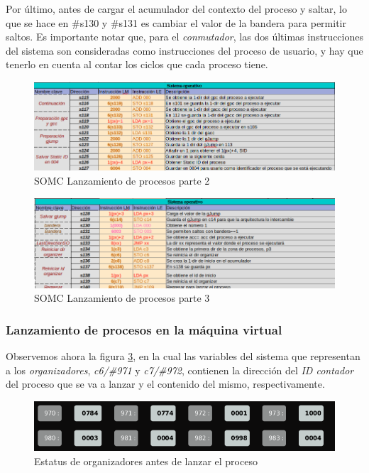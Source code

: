 \documentclass[letterpaper,12pt,oneside]{book}
\begin{document}
        Por último, antes de cargar el acumulador del contexto del proceso y saltar, lo que se hace en \#s130 y \#s131 es cambiar el valor
		de la bandera para permitir saltos. Es importante notar que, para el \textit{conmutador}, las dos últimas instrucciones del 
		sistema son consideradas como instrucciones del proceso de usuario, y hay 
		que tenerlo en cuenta al contar los ciclos que cada proceso tiene.
		
		
		\begin{figure}[h]		
			\centering
			\includegraphics[scale=0.53]{media/CARDIACC/SO_EjecutarProceso2.png}
			\caption{ SOMC Lanzamiento de procesos parte 2 }
			\label{fig:somcLanzamientoP2}
		\end{figure}
		
		\begin{figure}[h]		
			\centering
			\includegraphics[scale=0.53]{media/CARDIACC/SO_EjecutarProceso3.png}
			\caption{ SOMC Lanzamiento de procesos parte 3 }
			\label{fig:somcLanzamientoP3}
		\end{figure}

		\subsubsection{Lanzamiento de procesos en la máquina virtual}		
		
		Observemos ahora la figura \ref{fig:varSisStatExec1}, en la cual
		las variables del sistema que representan a los \textit{organizadores}, \textit{c6/\#971} y \textit{c7/\#972}, contienen la dirección del 
		\textit{ID contador} del proceso que se va
		a lanzar y el contenido del mismo, respectivamente.
		
		\begin{figure}[h]		
			\centering
			\includegraphics[scale=0.65]{media/CARDIACC/VariablesSistemaEstatusExec1.png}
			\caption{ Estatus de organizadores antes de lanzar el proceso}
			\label{fig:varSisStatExec1}
		\end{figure}
		
\end{document}
